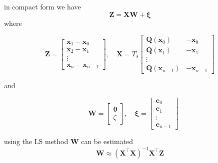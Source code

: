 \documentclass[12pt]{iopart}
\begin{document}
 in compact form we have 
\begin{equation}
	\mathbf Z=\mathbf X \mathbf W+\boldsymbol \xi 
\end{equation}
where 
\begin{small}
\begin{equation*}
	\mathbf Z=\left[
	\begin{array}{cccc}
		\mathbf x_{1}-\mathbf x_{0}\\
		\mathbf x_{2}-\mathbf x_{1}\\\vdots\\
		\mathbf x_{n}-\mathbf x_{n-1}
	\end{array}
	\right],\quad \mathbf X=T_s\left[
	\begin{array}{cccc}
		\mathbf Q(\mathbf x_0)&-\mathbf x_{0}\\
		\mathbf Q(\mathbf x_1)&-\mathbf x_{1}\\\vdots\\
		\mathbf Q(\mathbf x_{n-1})&-\mathbf x_{n-1}
	\end{array}
	\right] 
\end{equation*}
\end{small}
and
\begin{small}
\begin{equation*}
\quad \mathbf W=\left[
	\begin{array}{cc}
		\boldsymbol{\theta} \\
		\zeta
	\end{array}
	\right],\quad \boldsymbol \xi=\left[
	\begin{array}{cccc}
		\mathbf e_0\\\mathbf e_1\\\vdots\\\mathbf e_{n-1}
	\end{array}
	\right] 
\end{equation*}
\end{small}
using the LS method $ \mathbf W$ can be estimated 
\begin{equation}
	\mathbf W\approx(\mathbf X^\top\mathbf X)^{-1}\mathbf X^\top\mathbf Z 
\end{equation}
\end{document}
